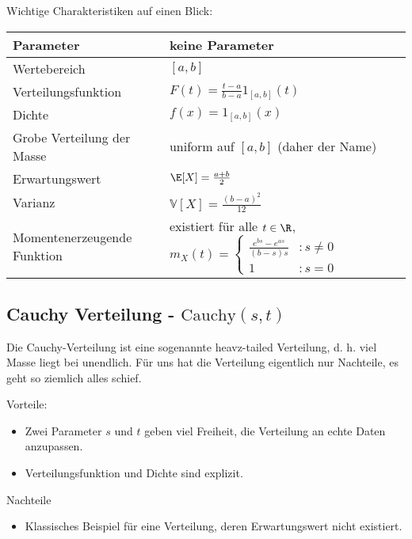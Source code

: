 Wichtige Charakteristiken auf einen Blick:
\begin{center}
\begin{tabular}[h]{|l|l|}
\hline
Parameter& keine Parameter \\
\hline
Wertebereich & $[a,b]$\\
\hline
Verteilungsfunktion & $F(t)= \frac{t-a}{b-a}1_{[a,b]}(t) $\\
\hline
Dichte & $f(x)=1_{[a,b]}(x)$\\
\hline
Grobe Verteilung der Masse & uniform auf $[a,b]$ (daher der Name)\\
\hline
Erwartungswert& $\E[X]=\frac{a+b}{2}$ \\
\hline
Varianz & $\mathbb V[X]=\frac{(b-a)^2}{12}$\\
\hline
Momentenerzeugende Funktion& existiert f\"ur alle $t\in \R$, $m_X(t)=\begin{cases} \frac{e^{bs}-e^{as}}{(b-s)s}&:s\neq 0\\ 1&:s=0 \end{cases}$\\
\hline
\end{tabular}
\end{center}

\subsection{Cauchy Verteilung - $\text{Cauchy}(s,t)$}
Die Cauchy-Verteilung ist eine sogenannte \glqq heavz-tailed\grqq{} Verteilung, d. h. viel Masse liegt bei unendlich. F\"ur uns hat die Verteilung eigentlich nur Nachteile, es geht so ziemlich alles schief.

{Vorteile:} 
\begin{itemize}
\item	Zwei Parameter $s$ und $t$ geben viel Freiheit, die Verteilung an echte Daten anzupassen. 
\item Verteilungsfunktion und Dichte sind explizit. 
\end{itemize}

{Nachteile}
\begin{itemize}
	\item Klassisches Beispiel f\"ur eine Verteilung, deren Erwartungswert nicht existiert.
\end{itemize}

